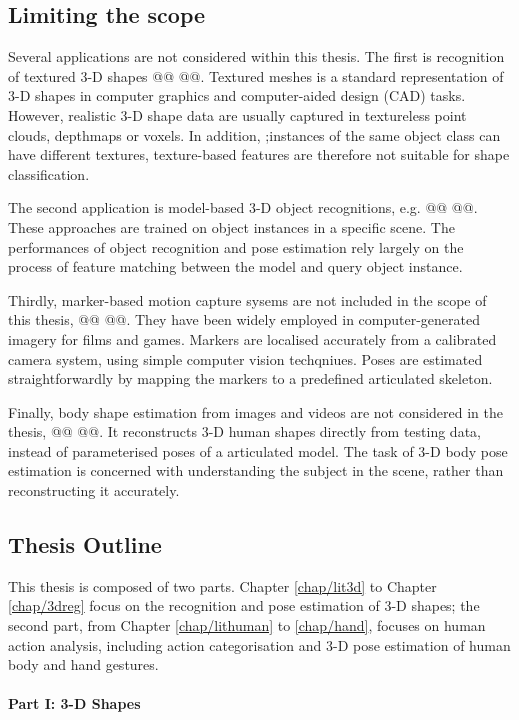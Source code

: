 \subsection{Limiting the scope}

Several applications are not considered within this thesis. 
The first is recognition of textured 3-D shapes @@ @@. Textured meshes is a standard representation of 3-D shapes in computer graphics and computer-aided design (CAD) tasks. However, realistic 3-D shape data are usually captured in textureless point clouds, depthmaps or voxels. In addition, ;instances of the same object class can have different textures, texture-based features are therefore not suitable for shape classification.      

The second application is model-based 3-D object recognitions, e.g. @@ @@. These approaches are trained on object instances in a specific scene. The performances of object recognition and pose estimation rely largely on the process of feature matching between the model and query object instance. 

Thirdly, marker-based motion capture sysems are not included in the scope of this thesis, @@ @@. They have been widely employed in computer-generated imagery for films and games. Markers are localised accurately from a calibrated camera system, using simple computer vision techqniues. Poses are estimated straightforwardly by mapping the markers to a predefined articulated skeleton.

Finally, body shape estimation from images and videos are not considered in the thesis, @@ @@. It reconstructs 3-D human shapes directly from testing data, instead of parameterised poses of a articulated model. The task of 3-D body pose estimation is concerned with understanding the subject in the scene, rather than reconstructing it accurately. 

\subsection{Thesis Outline}

This thesis is composed of two parts. Chapter \ref{chap/lit3d} to Chapter \ref{chap/3dreg} focus on the recognition and pose estimation of 3-D shapes; the second part, from Chapter \ref{chap/lithuman} to \ref{chap/hand}, focuses on human action analysis, including action categorisation and 3-D pose estimation of human body and hand gestures.  

\paragraph{Part I: 3-D Shapes}

